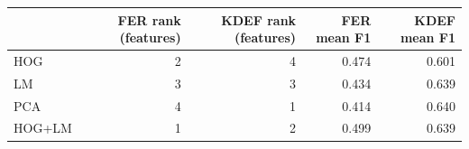 \begin{tabular}{lrrrr}
\toprule
 & FER rank (features) & KDEF rank (features) & FER mean F1 & KDEF mean F1 \\
\midrule
HOG & 2 & 4 & 0.474 & 0.601 \\
LM & 3 & 3 & 0.434 & 0.639 \\
PCA & 4 & 1 & 0.414 & 0.640 \\
HOG+LM & 1 & 2 & 0.499 & 0.639 \\
\bottomrule
\end{tabular}
